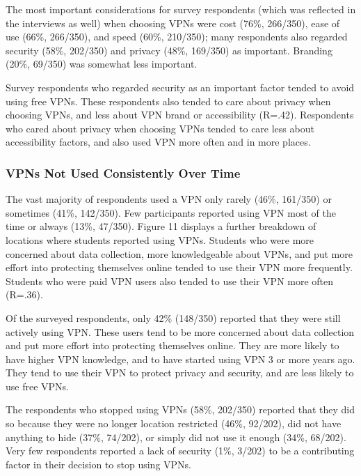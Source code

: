 The most important considerations for survey respondents (which was reflected in the interviews as well) when choosing VPNs
were cost (76\%, 266/350), ease of use (66\%, 266/350), and speed (60\%,
210/350); many respondents also regarded security (58\%, 202/350) and privacy
(48\%, 169/350) as important. Branding (20\%, 69/350) was somewhat less
important.

Survey respondents who regarded security as an important factor tended to avoid using
free VPNs. These respondents also tended to care about privacy when choosing
VPNs, and less about VPN brand or accessibility (R=.42). Respondents who cared
about privacy when choosing VPNs tended to care less about accessibility
factors, and also used VPN more often and in more places. 





\subsubsection{VPNs Not Used Consistently Over Time}

The vast majority of respondents used a VPN only rarely (46\%, 161/350) or
sometimes (41\%, 142/350). Few participants reported using VPN most of the
time or always (13\%, 47/350). Figure 11 displays a further breakdown of
locations where students reported using VPNs. Students who were more concerned
about data collection, more knowledgeable about VPNs, and put more effort into
protecting themselves online tended to use their VPN more frequently. Students
who were paid VPN users also tended to use their VPN more often (R=.36).



Of the surveyed respondents, only 42\% (148/350) reported that they were still
actively using VPN. These users tend to be more concerned about data
collection and put more effort into protecting themselves online. They are
more likely to have higher VPN knowledge, and to have started using VPN 3 or
more years ago. They tend to use their VPN to protect privacy and security,
and are less likely to use free VPNs.

The respondents who stopped using VPNs (58\%, 202/350) reported that they did
so because they were no longer location restricted (46\%, 92/202), did not
have anything to hide (37\%, 74/202), or simply did not use it enough (34\%,
68/202). Very few respondents reported a lack of security (1\%, 3/202) to be a
contributing factor in their decision to stop using VPNs.

